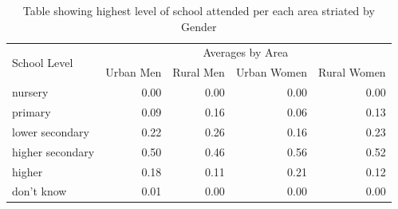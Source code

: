 \documentclass[stu, 12pt, floatsintext,longtable]{apa7}
\begin{document}
\begin{table}[]
    \centering
    \begin{tabular}{@{}lrrrr@{}}
        \toprule
        \multirow{2}{*}{School Level} & \multicolumn{4}{c}{Averages by Area}

        \\
                                      & \multicolumn{1}{l}{Urban Men}        &
        \multicolumn{1}{l}{Rural Men} & \multicolumn{1}{l}{Urban Women}      &
        \multicolumn{1}{l}{Rural Women}
        \\
        \midrule
        nursery                       & 0.00                                 &
        0.00
                                      & 0.00                                 &
        0.00
        \\
        primary                       & 0.09                                 &
        0.16
                                      & 0.06                                 &
        0.13
        \\
        lower secondary               & 0.22                                 &
        0.26
                                      & 0.16                                 &
        0.23
        \\
        higher secondary              & 0.50                                 &
        0.46
                                      & 0.56                                 &
        0.52
        \\
        higher                        & 0.18                                 &
        0.11
                                      & 0.21                                 &
        0.12
        \\
        don't know                    & 0.01                                 &
        0.00
                                      & 0.00                                 &
        0.00
        \\
        \bottomrule
    \end{tabular}
    \caption{Table showing highest level of school attended per each area
        striated by Gender}
\end{table}
\end{document}
